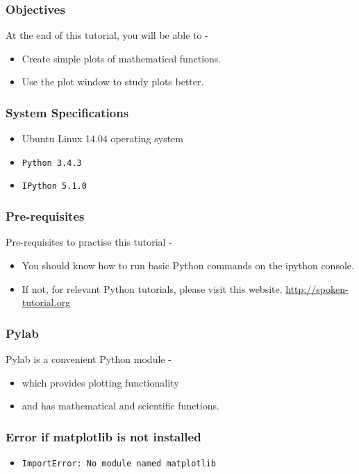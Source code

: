 \documentclass[17pt]{beamer}
\begin{document}
\begin{frame}
   \titlepage
\end{frame}
\begin{frame}
\frametitle{Objectives}
\label{sec-2}
At the end of this tutorial, you will be able to -\pause
\begin{itemize}
\item Create simple plots of mathematical functions. \pause
\item Use the plot window to study plots better.
\end{itemize}
\end{frame}
\begin{frame}
\frametitle{System Specifications}\pause
\begin{itemize}
\item Ubuntu Linux 14.04 operating system\pause
\item \texttt{Python 3.4.3} \pause
\item \texttt{IPython 5.1.0}
\end{itemize}
\end{frame}
\begin{frame}
\frametitle{Pre-requisites}
Pre-requisites to practise this tutorial -
\begin{itemize}
\item You should know how to run basic Python commands on the  ipython console.
\item If not, for relevant Python tutorials, please visit this website.
{\color{blue}\url{http://spoken-tutorial.org}}
\end{itemize}
\end{frame}
\begin{frame}
\frametitle{Pylab}
Pylab is a convenient Python module -\pause
\begin{itemize}
\item which provides plotting functionality\pause
\item and has mathematical and scientific functions.
\end{itemize}
\end{frame}
\begin{frame}
\frametitle{Error if matplotlib is not installed}
\label{sec-3}
\begin{itemize}
\item \texttt{ImportError: No module named matplotlib}\\
\label{sec-3_1}%
\end{itemize} %
\end{frame}
\end{document}
